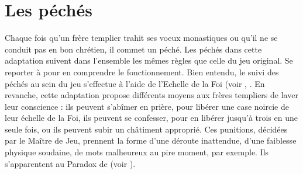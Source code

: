 \section{Les péchés}\label{sec:peches}
Chaque fois qu'un frère templier trahit ses voeux monastiques ou qu'il ne se conduit pas en bon chrétien, il commet un péché. Les péchés dans cette adaptation suivent dans l'ensemble les mêmes règles que celle du jeu original. Se reporter à \cite[p.222]{MC} pour en comprendre le fonctionnement. Bien entendu, le suivi des péchés au sein du jeu s'effectue à l'aide de l'Echelle de la Foi (voir , . En revanche, cette adaptation propose différents moyens aux frères templiers de laver leur conscience : ils peuvent s'abîmer en prière, pour libérer une case noircie de leur échelle de la Foi, ils peuvent se confesser, pour en libérer jusqu'à trois en une seule fois, ou ils peuvent subir un châtiment approprié. Ces punitions, décidées par le Maître de Jeu, prennent la forme d'une déroute inattendue, d'une faiblesse physique soudaine, de mots malheureux au pire moment, par exemple. Ils s'apparentent au Paradox de  (voir \cite[p.133]{MtA}).
